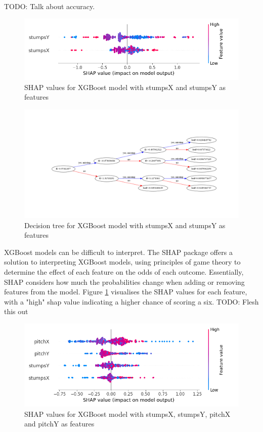 \documentclass[12pt,a4paper]{report}
\theoremstyle{definition}
\begin{document}
TODO: Talk about accuracy.

\begin{figure}[H]
    \centering
    \includegraphics[width=\linewidth]{shap_stumps.png}
    \caption{SHAP values for XGBoost model with stumpsX and stumpsY as features}
    \label{fig:ShapStumps}
\end{figure}

\begin{figure}[H]
    \centering
    \includegraphics[width=\linewidth]{tree_stumps.png}
    \caption{Decision tree for XGBoost model with stumpsX and stumpsY as features}
    \label{fig:TreeStumps}
\end{figure}

XGBoost models can be difficult to interpret. 
The SHAP package offers a solution to interpreting XGBoost models, using principles of game theory to determine the effect of each feature on the odds of each outcome.
Essentially, SHAP considers how much the probabilities change when adding or removing features from the model.
Figure \ref{fig:ShapStumps} visualises the SHAP values for each feature, with a "high" shap value indicating a higher chance of scoring a six.
TODO: Flesh this out

\begin{figure}[H]
    \centering
    \includegraphics[width=\linewidth]{shap_stumps_pitch.png}
    \caption{SHAP values for XGBoost model with stumpsX, stumpsY, pitchX and pitchY as features}
    \label{fig:ShapStumpsPitch}
\end{figure}
\end{document}
